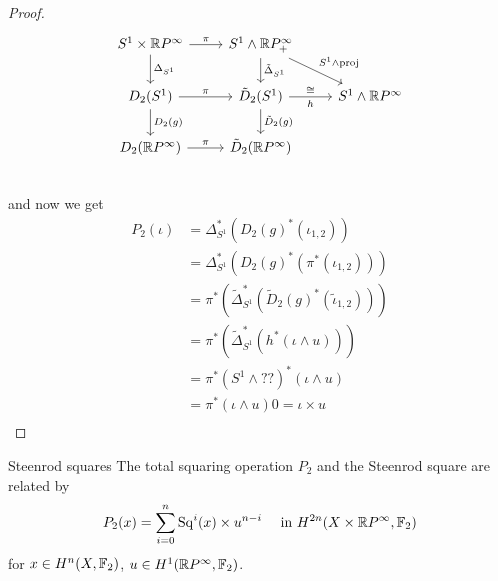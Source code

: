 \documentclass[language=english]{TemplateLecture}
\begin{document}
\begin{proof}
    \[\begin{tikzcd}
        S^1\times \ir P^\infty  \ar[d, "\Delta_{S^1}"] \ar[r, "\pi"] & S^1 \wedge \ir P^\infty _+ \ar[d, "\tilde\Delta_{S^1}"]\ar[dr, "S^1 \wedge \mathrm{proj}"] &   \\
        D_2(S^1) \ar[d, "D_2(g)"]   \ar[r, "\pi"] & \tilde D_2(S^1) \ar[d, "\tilde D_2(g)"]  \ar[r, "\cong", "h"'] & S^1 \wedge \ir P^\infty \\
        D_2(\ir P^\infty) \ar[r, "\pi"]  & \tilde D_2(\ir P^\infty) &\\
    \end{tikzcd}\]
    and now we get
    \[\begin{split}
        P_2(\iota) &= \Delta^*_{S^1}(D_2(g)^*(\iota_{1,2})) \\
        &= \Delta^*_{S^1}(D_2(g)^*(\pi^*(\iota_{1,2}))) \\
        &= \pi^*(\tilde \Delta_{S^1}^*(\tilde D_2(g)^*(\tilde \iota_{1,2})))\\
        &= \pi^*(\tilde \Delta_{S^1}^*(h^*(\iota\wedge u))) \\
        &= \pi^*(S^1 \wedge ??)^*(\iota\wedge u) \\
        &= \pi^*(\iota\wedge u)0= \iota \times u \\
    \end{split}\]
\end{proof}

\begin{thm}{Steenrod squares}{}
    The total squaring operation \(P_2\) and the Steenrod square are related by
    \[P_2(x) = \sum_{i = 0}^n \mathrm{Sq}^i(x)\times u^{n-i}\quad \text{ in } H^{2n}(X\times \mathbb{R} P^\infty, \mathbb{F}_2)\]
    for \(x \in H^n(X, \mathbb{F}_2)\), \(u\in H^1(\mathbb{R} P^\infty, \mathbb{F}_2)\).
\end{thm}
\end{document}

